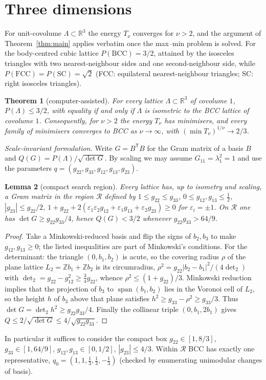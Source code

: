 \documentclass[11pt,a4paper]{amsart}
\newtheorem{theorem}{Theorem}
\newtheorem{lemma}[theorem]{Lemma}
\theoremstyle{definition}
\newcommand{\R}{\mathbb{R}}
\newcommand{\Z}{\mathbb{Z}}
\newcommand{\Lat}{\Lambda}
\begin{document}
\section{Three dimensions}\label{sec:3d}
For unit-covolume $\Lat\subset\R^3$ the energy $T_\nu$ converges for $\nu>2$, and the argument of Theorem~\ref{thm:main} applies verbatim once the max--min problem is solved.
For the body-centred cubic lattice $P(\mathrm{BCC})=3/2$, attained by the isosceles triangles with two nearest-neighbour sides and one second-neighbour side, while $P(\mathrm{FCC})=P(\mathrm{SC})=\sqrt2$ (FCC: equilateral nearest-neighbour triangles; SC: right isosceles triangles).
\begin{theorem}[computer-assisted]\label{thm:3d}
For every lattice $\Lat\subset\R^3$ of covolume $1$, $P(\Lat)\le 3/2$, with equality if and only if $\Lat$ is isometric to the BCC lattice of covolume $1$. Consequently, for $\nu>2$ the energy $T_\nu$ has minimisers, and every family of minimisers converges to BCC as $\nu\to\infty$, with $(\min T_\nu)^{1/\nu}\to 2/3$.
\end{theorem}
\noindent\emph{Scale-invariant formulation.} Write $G=B^{\mathsf T}B$ for the Gram matrix of a basis $B$ and $Q(G)=P(\Lat)/\sqrt{\det G}$. By scaling we may assume $G_{11}=\lambda_1^2=1$ and use the parameters $q=(g_{22},g_{33},g_{12},g_{13},g_{23})$.

\begin{lemma}[compact search region]\label{lem:region3}
Every lattice has, up to isometry and scaling, a Gram matrix in the region $\mathcal R$ defined by
$1\le g_{22}\le g_{33}$, $0\le g_{12},g_{13}\le \tfrac12$, $|g_{23}|\le g_{22}/2$, $1+g_{22}+2(\varepsilon_1\varepsilon_2g_{12}+\varepsilon_1g_{13}+\varepsilon_2g_{23})\ge0$ for $\varepsilon_i=\pm1$.
On $\mathcal R$ one has $\det G\ge g_{22}g_{33}/4$, hence $Q(G)<3/2$ whenever $g_{22}g_{33}>64/9$.
\end{lemma}
\begin{proof}
Take a Minkowski-reduced basis and flip the signs of $b_2,b_3$ to make $g_{12},g_{13}\ge0$; the listed inequalities are part of Minkowski's conditions. For the determinant: the triangle $(0,b_1,b_2)$ is acute, so the covering radius $\rho$ of the plane lattice $L_2=\Z b_1+\Z b_2$ is its circumradius, $\rho^2=g_{22}|b_2-b_1|^2/(4\det_2)$ with $\det_2=g_{22}-g_{12}^2\ge\tfrac34g_{22}$, whence $\rho^2\le(1+g_{22})/3$. Minkowski reduction implies that the projection of $b_3$ to $\operatorname{span}(b_1,b_2)$ lies in the Voronoi cell of $L_2$, so the height $h$ of $b_3$ above that plane satisfies $h^2\ge g_{33}-\rho^2\ge g_{33}/3$. Thus $\det G=\det_2h^2\ge g_{22}g_{33}/4$. Finally the collinear triple $(0,b_1,2b_1)$ gives $Q\le2/\sqrt{\det G}\le4/\sqrt{g_{22}g_{33}}$.
\end{proof}
In particular it suffices to consider the compact box $g_{22}\in[1,8/3]$, $g_{33}\in[1,64/9]$, $g_{12},g_{13}\in[0,1/2]$, $|g_{23}|\le4/3$.
Within $\mathcal R$ BCC has exactly one representative, $q_0=(1,1,\tfrac13,\tfrac13,-\tfrac13)$ (checked by enumerating unimodular changes of basis).
\end{document}
